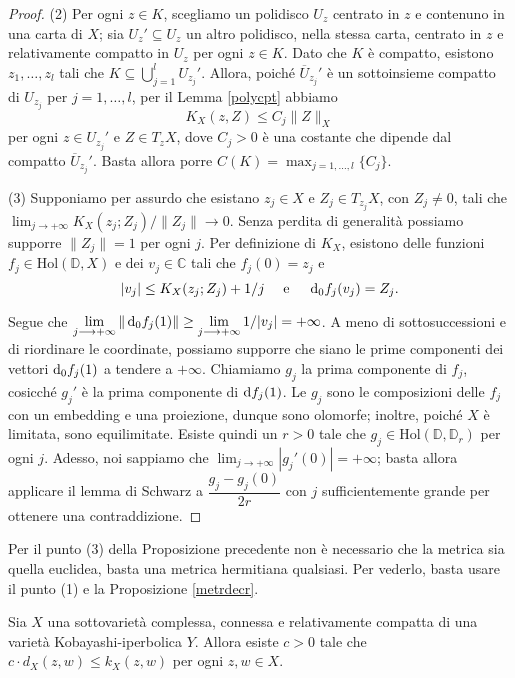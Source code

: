 \begin{proof}
    (2) Per ogni $z \in K$, scegliamo un polidisco $U_z$ centrato in $z$ e contenuno in una carta di $X$; sia $U_z'\subseteq U_z$ un altro polidisco, nella stessa carta, centrato in $z$ e relativamente compatto in $U_z$ per ogni $z \in K$. Dato che $K$ è compatto, esistono $z_1,\dots,z_l$ tali che $K\subseteq\displaystyle\bigcup_{j=1}^l U_{z_j}'$. Allora, poiché $\overline{U}_{z_j}'$ è un sottoinsieme compatto di $U_{z_j}$ per $j=1,\dots,l$, per il Lemma \ref{polycpt} abbiamo
    $$K_X(z,Z) \le C_j\|Z\|_X$$
    per ogni $z \in U_{z_j}'$ e $Z\in T_zX$, dove $C_j>0$ è una costante che dipende dal compatto $\overline{U}_{z_j}'$. Basta allora porre $C(K)=\displaystyle\max_{j=1,\dots,l}\{C_j\}$.

    (3) Supponiamo per assurdo che esistano $z_j \in X$ e $Z_j \in T_{z_j}X$, con $Z_j\not=0$, tali che $\displaystyle \lim_{j \longrightarrow +\infty} K_X(z_j;Z_j)/\|Z_j\| \longrightarrow 0$. Senza perdita di generalità possiamo supporre $\|Z_j\|=1$ per ogni $j$. Per definizione di $K_X$, esistono delle funzioni $f_j\in\text{Hol}(\mathbb{D},X)$ e dei $v_j \in \mathbb{C}$ tali che $f_j(0)=z_j$ e
    $$|v_j| \le K_X(z_j;Z_j)+1/j\quad\text{ e }\quad \mathop{}\!\mathrm{d}_0 f_j(v_j)=Z_j.$$

    Segue che $\displaystyle \lim_{j \longrightarrow +\infty}\|\mathop{}\!\mathrm{d}_0f_j(1)\| \ge \lim_{j \longrightarrow +\infty}1/|v_j|=+\infty$. A meno di sottosuccessioni e di riordinare le coordinate, possiamo supporre che siano le prime componenti dei vettori $\mathop{}\!\mathrm{d}_0f_j(1)$ a tendere a $+\infty$. Chiamiamo $g_j$ la prima componente di $f_j$, cosicché $g_j'$ è la prima componente di $\mathop{}\!\mathrm{d} f_j(1)$. Le $g_j$ sono le composizioni delle $f_j$ con un embedding e una proiezione, dunque sono olomorfe; inoltre, poiché $X$ è limitata, sono equilimitate. Esiste quindi un $r>0$ tale che $g_j \in \text{Hol}(\mathbb{D},\mathbb{D}_r)$ per ogni $j$. Adesso, noi sappiamo che $\displaystyle\lim_{j\longrightarrow +\infty} |g_j'(0)|=+\infty$; basta allora applicare il lemma di Schwarz a $\dfrac{g_j-g_j(0)}{2r}$ con $j$ sufficientemente grande per ottenere una contraddizione.
\end{proof}

\begin{oss} \label{basta_herm}
    Per il punto (3) della Proposizione precedente non è necessario che la metrica sia quella euclidea, basta una metrica hermitiana qualsiasi. Per vederlo, basta usare il punto (1) e la Proposizione \ref{metrdecr}.
\end{oss}

\begin{cor} \label{dist_da_sotto}
    Sia $X$ una sottovarietà complessa, connessa e relativamente compatta di una varietà Kobayashi-iperbolica $Y$. Allora esiste $c>0$ tale che $c\cdot d_X(z,w) \le k_X(z,w)$ per ogni $z,w \in X$.
\end{cor}

